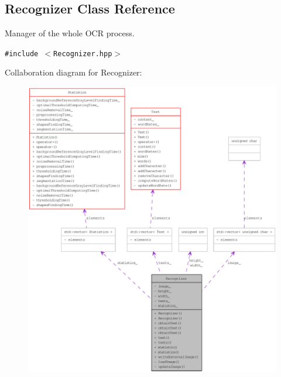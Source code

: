 \hypertarget{class_recognizer}{
\subsection{Recognizer Class Reference}
\label{class_recognizer}
}
Manager of the whole OCR process.  


{\tt \#include $<$Recognizer.hpp$>$}

Collaboration diagram for Recognizer:\nopagebreak
\begin{figure}[H]
\begin{center}
\leavevmode
\includegraphics[width=400pt]{class_recognizer__coll__graph}
\end{center}
\end{figure}

